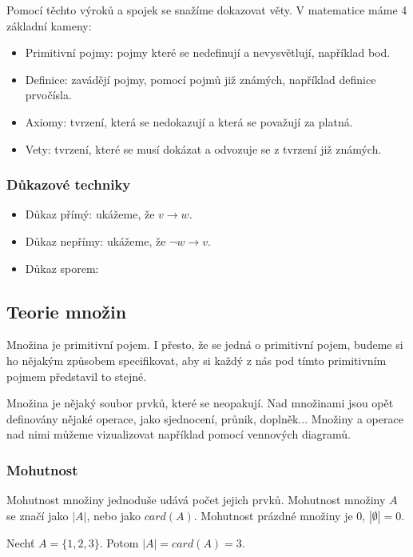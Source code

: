 Pomocí těchto výroků a spojek se snažíme dokazovat věty. V matematice máme 4 základní kameny:
\begin{itemize}
	\item Primitivní pojmy: pojmy které se nedefinují a nevysvětlují, například bod.
	\item Definice: zavádějí pojmy, pomocí pojmů již známých, například definice prvočísla.
	\item Axiomy: tvrzení, která se nedokazují a která se považují za platná.
	\item Vety: tvrzení, které se musí dokázat a odvozuje se z tvrzení již známých.
\end{itemize}

\subsubsection*{Důkazové techniky}
\begin{itemize}
	\item Důkaz přímý: ukážeme, že $v \rightarrow w$.
	\item Důkaz nepřímy: ukážeme, že $\lnot w \rightarrow v$.
	\item Důkaz sporem:
\end{itemize}

\subsection{Teorie množin}

Množina je primitivní pojem. I přesto, že se jedná o primitivní pojem, budeme si ho nějakým
způsobem specifikovat, aby si každý z nás pod tímto primitivním pojmem představil to stejné.

\begin{concept}[Množina]
Množina je nějaký soubor prvků, které se neopakují.
Nad množinami jsou opět definovány nějaké operace, jako sjednocení, průnik, doplněk...
Množiny a operace nad nimi můžeme vizualizovat například pomocí vennových diagramů.
\end{concept}

\subsubsection*{Mohutnost}
\begin{concept}
    Mohutnost množiny jednoduše udává počet jejich prvků. Mohutnost množiny $A$ se značí
    jako $|A|$, nebo jako $card(A)$.
    Mohutnost prázdné množiny je 0, $|\emptyset| = 0$.
\end{concept}
\begin{example}
    Nechť $A = \{1, 2, 3\}$. Potom $|A| = card(A) = 3$.
\end{example}

